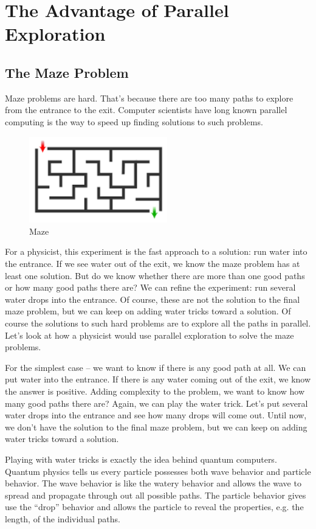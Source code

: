 \documentclass{book}
\begin{document}
\section{The Advantage of Parallel Exploration}
\subsection{The Maze Problem}
Maze problems are hard. That's because there are too many paths to explore from the entrance to the exit. Computer scientists have long known parallel computing is the way to speed up finding solutions to such problems.

\begin{figure}[ht]
\includegraphics[width=6cm]{maze.png}
\caption{Maze}
\label{Maze}
\end{figure}

For a physicist, this experiment is the fast approach to a solution: run water into the entrance. If we see water out of the exit, we know the maze problem has at least one solution. But do we know whether there are more than one good paths or how many good paths there are? We can refine the experiment: run several water drops into the entrance. Of course, these are not the solution to the final maze problem, but we can keep on adding water tricks toward a solution.
Of course the solutions to such hard problems are to explore all the paths in parallel. Let’s look at how a physicist would use parallel exploration to solve the maze problems.

For the simplest case – we want to know if there is any good path at all. We can put water into the entrance. If there is any water coming out of the exit, we know the answer is positive. Adding complexity to the problem, we want to know how many good paths there are? Again, we can play the water trick. Let’s put several water drops into the entrance and see how many drops will come out. Until now, we don't have the solution to the final maze problem, but we can keep on adding water tricks toward a solution.

Playing with water tricks is exactly the idea behind quantum computers. Quantum physics tells us every particle possesses both wave behavior and particle behavior. The wave behavior is like the watery behavior and allows the wave to spread and propagate through out all possible paths. The particle behavior gives use the “drop” behavior and allows the particle to reveal the properties, e.g. the length, of the individual paths.
\end{document}

